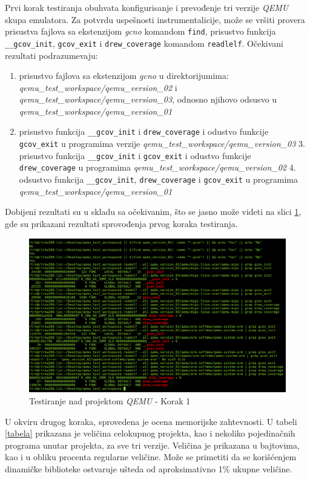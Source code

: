 \documentclass[12pt,oneside]{memoir}
\newcommand{\kod}[1]{\texttt{#1}}
\newcommand{\strano}[1]{\textit{#1}}
\begin{document}
Prvi korak testiranja obuhvata konfigurisanje i prevođenje tri verzije \strano{QEMU} skupa emulatora. Za  potvrdu uspešnosti instrumentalicije, može se vršiti provera prisustva fajlova sa ekstenzijom \strano{gcno} komandom \kod{find},  prisustvo funkcija  \kod{\_\_gcov\_init}, \kod{gcov\_exit} i \kod{drew\_coverage} komandom \kod{readlelf}. Očekivani rezultati podrazumevaju:
\begin{enumerate}
\item prisustvo fajlova sa ekstenzijom \strano{gcno} u direktorijumima: \strano{qemu\_test\_workspace/qemu\_version\_02} i \strano{qemu\_test\_workspace/qemu\_version\_03}, odnosno njihovo odsusvo u \strano{qemu\_test\_workspace/qemu\_version\_01}
\item prisustvo funkcija \kod{\_\_gcov\_init} i \kod{drew\_coverage} i odustvo funkcije \kod{gcov\_exit} u programima verzije \strano{qemu\_test\_workspace/qemu\_version\_03}
3. prisustvo funkcija \kod{\_\_gcov\_init} i \kod{gcov\_exit} i odustvo funkcije \kod{drew\_coverage} u programima  \strano{qemu\_test\_workspace/qemu\_version\_02}
4. odsustvo funkcija \kod{\_\_gcov\_init}, \kod{drew\_coverage} i \kod{gcov\_exit} u programima \strano{qemu\_test\_workspace/qemu\_version\_01}
\end{enumerate}
Dobijeni rezultati su u skladu sa očekivanim, što se jasno može videti na slici \ref{fig:qemu-test-1}, gde su prikazani rezultati sprovođenja prvog koraka testiranja.  

\begin{figure}[!ht]
  \centering
  \label{fig:qemu-test-1}
  \includegraphics[width=\textwidth]{img/qemu-test-1.png}
  \caption{Testiranje nad projektom \strano{QEMU} - Korak 1}
\end{figure} 


U okviru drugog koraka, sprovedena je ocena memorijske zahtevnosti. U tabeli \ref{tabela} prikazana je veličina celokupnog projekta, kao i nekoliko pojedinačnih programa unutar projekta, za sve tri verzije. Veličina je prikazana u bajtovima, kao i u obliku procenta regularne veličine. Može se primetiti da se korišćenjem dinamičke biblioteke ostvaruje ušteda od aproksimativno 1\% ukupne veličine.
\end{document}
